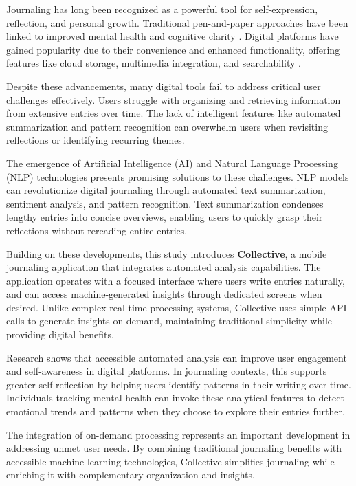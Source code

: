 Journaling has long been recognized as a powerful tool for self-expression, reflection, and personal growth. Traditional pen-and-paper approaches have been linked to improved mental health and cognitive clarity \cite{pennebaker1999forming}. Digital platforms have gained popularity due to their convenience and enhanced functionality, offering features like cloud storage, multimedia integration, and searchability \cite{sloan2015efficacy}.

Despite these advancements, many digital tools fail to address critical user challenges effectively. Users struggle with organizing and retrieving information from extensive entries over time. The lack of intelligent features like automated summarization and pattern recognition can overwhelm users when revisiting reflections or identifying recurring themes.

The emergence of Artificial Intelligence (AI) and Natural Language Processing (NLP) technologies presents promising solutions to these challenges. NLP models can revolutionize digital journaling through automated text summarization, sentiment analysis, and pattern recognition. Text summarization condenses lengthy entries into concise overviews, enabling users to quickly grasp their reflections without rereading entire entries.

Building on these developments, this study introduces \textbf{Collective}, a mobile journaling application that integrates automated analysis capabilities. The application operates with a focused interface where users write entries naturally, and can access machine-generated insights through dedicated screens when desired. Unlike complex real-time processing systems, Collective uses simple API calls to generate insights on-demand, maintaining traditional simplicity while providing digital benefits.

Research shows that accessible automated analysis can improve user engagement and self-awareness in digital platforms. In journaling contexts, this supports greater self-reflection by helping users identify patterns in their writing over time. Individuals tracking mental health can invoke these analytical features to detect emotional trends and patterns when they choose to explore their entries further.

The integration of on-demand processing represents an important development in addressing unmet user needs. By combining traditional journaling benefits with accessible machine learning technologies, Collective simplifies journaling while enriching it with complementary organization and insights.

